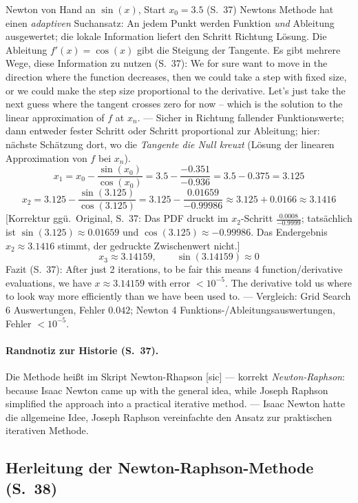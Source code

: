 \begin{bspbox}{Newton von Hand an $\sin(x)$, Start $x_0 = 3.5$ (S.~37)}
Newtons Methode hat einen \emph{adaptiven} Suchansatz: An jedem Punkt werden Funktion \emph{und} Ableitung ausgewertet; die lokale Information liefert den Schritt Richtung Lösung. Die Ableitung $f'(x) = \cos(x)$ gibt die Steigung der Tangente. Es gibt mehrere Wege, diese Information zu nutzen (S.~37): \glqq We for sure want to move in the direction where the function decreases, then we could take a step with fixed size, or we could make the step size proportional to the derivative. Let's just take the next guess where the tangent crosses zero for now -- which is the solution to the linear approximation of $f$ at $x_n$.\grqq{} — Sicher in Richtung fallender Funktionswerte; dann entweder fester Schritt oder Schritt proportional zur Ableitung; hier: nächste Schätzung dort, wo die \emph{Tangente die Null kreuzt} (Lösung der linearen Approximation von $f$ bei $x_n$).
\[ x_1 = x_0 - \frac{\sin(x_0)}{\cos(x_0)} = 3.5 - \frac{-0.351}{-0.936} = 3.5 - 0.375 = 3.125 \]
\[ x_2 = 3.125 - \frac{\sin(3.125)}{\cos(3.125)} = 3.125 - \frac{0.01659}{-0.99986} \approx 3.125 + 0.0166 \approx 3.1416 \]
[Korrektur ggü.\ Original, S.~37: Das PDF druckt im $x_2$-Schritt \glqq$\frac{0.0008}{-0.9999}$\grqq; tatsächlich ist $\sin(3.125) \approx 0.01659$ und $\cos(3.125) \approx -0.99986$. Das Endergebnis $x_2 \approx 3.1416$ stimmt, der gedruckte Zwischenwert nicht.]
\[ x_3 \approx 3.14159, \qquad \sin(3.14159) \approx 0 \]
Fazit (S.~37): \glqq After just 2 iterations, to be fair this means 4 function/derivative evaluations, we have $x \approx 3.14159$ with error $< 10^{-5}$. The derivative told us where to look way more efficiently than we have been used to.\grqq{} — Vergleich: Grid Search 6 Auswertungen, Fehler $0.042$; Newton 4 Funktions-/Ableitungsauswertungen, Fehler $< 10^{-5}$.
\end{bspbox}

\paragraph{Randnotiz zur Historie (S.~37).} Die Methode heißt im Skript \glqq Newton-Rhapson\grqq{} [sic] — korrekt \emph{Newton-Raphson}: \glqq because Isaac Newton came up with the general idea, while Joseph Raphson simplified the approach into a practical iterative method.\grqq{} — Isaac Newton hatte die allgemeine Idee, Joseph Raphson vereinfachte den Ansatz zur praktischen iterativen Methode.

\subsection{Herleitung der Newton-Raphson-Methode (S.~38)}

